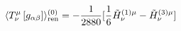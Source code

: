 \begin{equation}
\langle T_{\nu }^{\mu }\left[ g_{\alpha \beta }\right] \rangle _{{\rm ren}%
}^{(0)}=-\frac{1}{2880}[\frac{1}{6} \tilde H^{(1)\mu}_{\nu}-\tilde
H^{(3)\mu}_{\nu}]
\end{equation}

